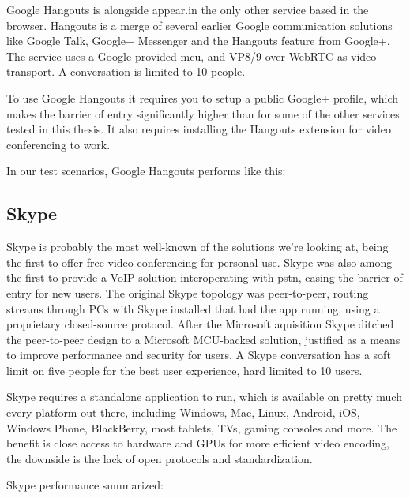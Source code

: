 Google Hangouts is alongside appear.in the only other service based in the browser. Hangouts is a merge of several earlier Google communication solutions like Google Talk, Google+ Messenger and the Hangouts feature from Google+. The service uses a Google-provided \gls{mcu}, and VP8/9 over WebRTC as video transport. A conversation is limited to 10 people.

To use Google Hangouts it requires you to setup a public Google+ profile, which makes the barrier of entry significantly higher than for some of the other services tested in this thesis. It also requires installing the Hangouts extension for video conferencing to work.

In our test scenarios, Google Hangouts performs like this:



\subsection{Skype}

Skype is probably the most well-known of the solutions we're looking at, being the first to offer free video conferencing for personal use. Skype was also among the first to provide a VoIP solution interoperating with \gls{pstn}, easing the barrier of entry for new users. The original Skype topology was peer-to-peer, routing streams through PCs with Skype installed that had the app running, using a proprietary closed-source protocol. After the Microsoft aquisition Skype ditched the peer-to-peer design to a Microsoft MCU-backed solution, justified as a means to improve performance and security for users. A Skype conversation has a soft limit on five people for the best user experience, hard limited to 10 users.

Skype requires a standalone application to run, which is available on pretty much every platform out there, including Windows, Mac, Linux, Android, iOS, Windows Phone, BlackBerry, most tablets, TVs, gaming consoles and more. The benefit is close access to hardware and GPUs for more efficient video encoding, the downside is the lack of open protocols and standardization.

Skype performance summarized:







